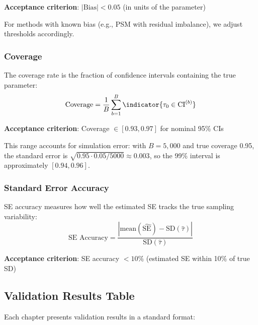 \textbf{Acceptance criterion}: $|\text{Bias}| < 0.05$ (in units of the parameter)

For methods with known bias (e.g., PSM with residual imbalance), we adjust thresholds accordingly.

\subsubsection{Coverage}

\begin{definition}[Coverage]
\label{def:coverage_metric}
The coverage rate is the fraction of confidence intervals containing the true parameter:
\begin{equation}
\text{Coverage} = \frac{1}{B} \sum_{b=1}^{B} \indicator{\tau_0 \in \text{CI}^{(b)}}
\label{eq:coverage}
\end{equation}
\end{definition}

\textbf{Acceptance criterion}: Coverage $\in [0.93, 0.97]$ for nominal 95\% CIs

This range accounts for simulation error: with $B = 5{,}000$ and true coverage 0.95, the standard error is $\sqrt{0.95 \cdot 0.05 / 5000} \approx 0.003$, so the 99\% interval is approximately $[0.94, 0.96]$.

\subsubsection{Standard Error Accuracy}

\begin{definition}[SE Accuracy]
\label{def:se_accuracy}
SE accuracy measures how well the estimated SE tracks the true sampling variability:
\begin{equation}
\text{SE Accuracy} = \frac{|\text{mean}(\hat{\text{SE}}) - \text{SD}(\hat{\tau})|}{\text{SD}(\hat{\tau})}
\label{eq:se_accuracy}
\end{equation}
\end{definition}

\textbf{Acceptance criterion}: SE accuracy $< 10\%$ (estimated SE within 10\% of true SD)

\subsection{Validation Results Table}

Each chapter presents validation results in a standard format:

